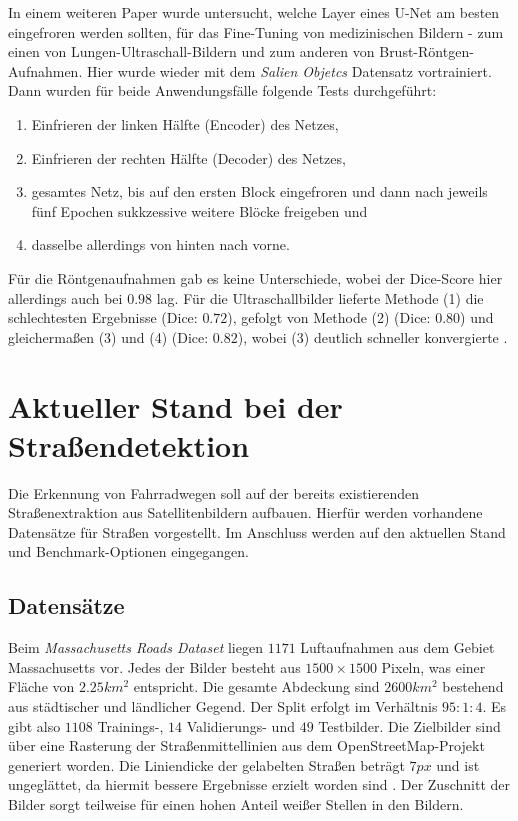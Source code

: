 In einem weiteren Paper wurde untersucht, welche Layer eines U-Net am besten eingefroren werden sollten, für das Fine-Tuning von medizinischen Bildern - 
zum einen von Lungen-Ultraschall-Bildern und zum anderen von Brust-Röntgen-Aufnahmen. 
Hier wurde wieder mit dem \textit{Salien Objetcs} Datensatz vortrainiert. Dann wurden für beide Anwendungsfälle folgende Tests durchgeführt: 
\begin{enumerate}
	\item Einfrieren der linken Hälfte (Encoder) des Netzes,
	\item Einfrieren der rechten Hälfte (Decoder) des Netzes,
	\item gesamtes Netz, bis auf den ersten Block eingefroren und dann nach jeweils fünf Epochen sukkzessive weitere Blöcke freigeben und
	\item dasselbe allerdings von hinten nach vorne.
\end{enumerate}
Für die Röntgenaufnahmen gab es keine Unterschiede, wobei der Dice-Score hier allerdings auch bei $0.98$ lag. 
Für die Ultraschallbilder lieferte Methode (1) die schlechtesten Ergebnisse (Dice: $0.72$), gefolgt von Methode (2) (Dice: $0.80$) 
und gleichermaßen (3) und (4) (Dice: $0.82$), wobei (3) deutlich schneller konvergierte \cite{Amiri.19.02.2020}.


\section{Aktueller Stand bei der Straßendetektion}

Die Erkennung von Fahrradwegen soll auf der bereits existierenden Straßenextraktion aus Satellitenbildern aufbauen.
Hierfür werden vorhandene Datensätze für Straßen vorgestellt. 
Im Anschluss werden auf den aktuellen Stand und Benchmark-Optionen eingegangen.

\subsection{Datensätze} \label{sec:road-detection:roads-data}

Beim \textit{Massachusetts Roads Dataset} liegen $1171$ Luftaufnahmen aus dem Gebiet Massachusetts vor.
Jedes der Bilder besteht aus $1500\times 1500$ Pixeln, was einer Fläche von $2.25 km^2$ entspricht.
Die gesamte Abdeckung sind $2600 km^2$ bestehend aus städtischer und ländlicher Gegend.
Der Split erfolgt im Verhältnis $95:1:4$.
Es gibt also $1108$ Trainings-, $14$ Validierungs- und $49$ Testbilder.
Die Zielbilder sind über eine Rasterung der Straßenmittellinien aus dem OpenStreetMap-Projekt generiert worden.
Die Liniendicke der gelabelten Straßen beträgt $7 px$ und ist ungeglättet, da hiermit bessere Ergebnisse erzielt worden sind \cite[S.~85f]{.06.04.2014}.
Der Zuschnitt der Bilder sorgt teilweise für einen hohen Anteil weißer Stellen in den Bildern.

